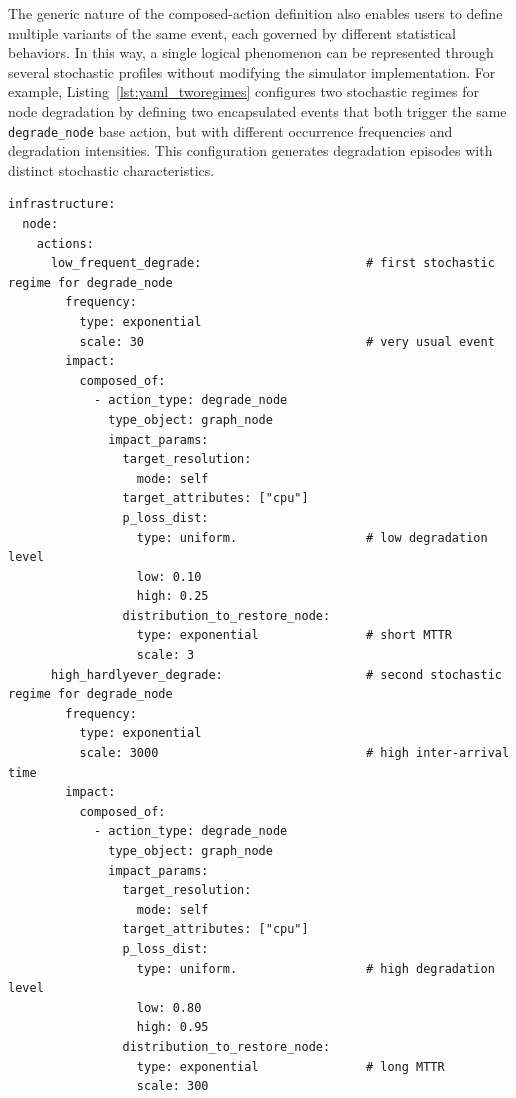 \documentclass[ASNA]{USG} %
\begin{document}
The generic nature of the composed-action definition also enables users to define multiple variants of the same event, each governed by different statistical behaviors. In this way, a single logical phenomenon can be represented through several stochastic profiles without modifying the simulator implementation. For example, Listing~\ref{lst:yaml_tworegimes} configures two stochastic regimes for node degradation by defining two encapsulated events that both trigger the same \texttt{degrade\_node} base action, but with different occurrence frequencies and degradation intensities. This configuration generates degradation episodes with distinct stochastic characteristics.



\begin{lstlisting}[escapechar=\%,caption={YAML configuration of two independent stocasthic regimes for degrade node event.},label=lst:yaml_tworegimes, basicstyle=\fontsize{8}{10}\selectfont\ttfamily]
infrastructure:
  node:
    actions:
      low_frequent_degrade:                       # first stochastic regime for degrade_node 
        frequency:
          type: exponential
          scale: 30                               # very usual event
        impact:
          composed_of:
            - action_type: degrade_node
              type_object: graph_node
              impact_params:
                target_resolution:
                  mode: self
                target_attributes: ["cpu"]
                p_loss_dist:
                  type: uniform.                  # low degradation level
                  low: 0.10
                  high: 0.25
                distribution_to_restore_node:
                  type: exponential               # short MTTR
                  scale: 3
      high_hardlyever_degrade:                    # second stochastic regime for degrade_node
        frequency:
          type: exponential
          scale: 3000                             # high inter-arrival time
        impact:
          composed_of:
            - action_type: degrade_node
              type_object: graph_node
              impact_params:
                target_resolution:
                  mode: self
                target_attributes: ["cpu"]
                p_loss_dist:
                  type: uniform.                  # high degradation level
                  low: 0.80
                  high: 0.95
                distribution_to_restore_node:
                  type: exponential               # long MTTR
                  scale: 300
\end{lstlisting}
\end{document}
